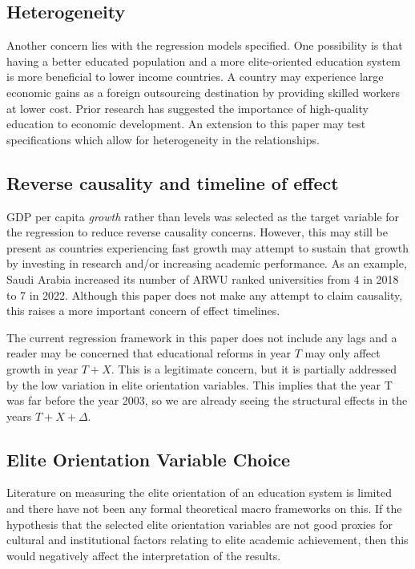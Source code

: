 \documentclass[11pt]{article}
\begin{document}
\subsection{Heterogeneity}
Another concern lies with the regression models specified. One possibility is that having a better educated population and a more elite-oriented education system is more beneficial to lower income countries. A country may experience large economic gains as a foreign outsourcing destination by providing skilled workers at lower cost. Prior research has suggested the importance of high-quality education to economic development. An extension to this paper may test specifications which allow for heterogeneity in the relationships.

\subsection{Reverse causality and timeline of effect}
GDP per capita \textit{growth} rather than levels was selected as the target variable for the regression to reduce reverse causality concerns. However, this may still be present as countries experiencing fast growth may attempt to sustain that growth by investing in research and/or increasing academic performance. As an example, Saudi Arabia increased its number of ARWU ranked universities from 4 in 2018 to 7 in 2022. Although this paper does not make any attempt to claim causality, this raises a more important concern of effect timelines.

The current regression framework in this paper does not include any lags and a reader may be concerned that educational reforms in year $T$ may only affect growth in year $T+X$. This is a legitimate concern, but it is partially addressed by the low variation in elite orientation variables. This implies that the year T was far before the year 2003, so we are already seeing the structural effects in the years $T+X+\Delta$.

\subsection{Elite Orientation Variable Choice}
Literature on measuring the elite orientation of an education system is limited and there have not been any formal theoretical macro frameworks on this. If the hypothesis that the selected elite orientation variables are not good proxies for cultural and institutional factors relating to elite academic achievement, then this would negatively affect the interpretation of the results.
\end{document}
